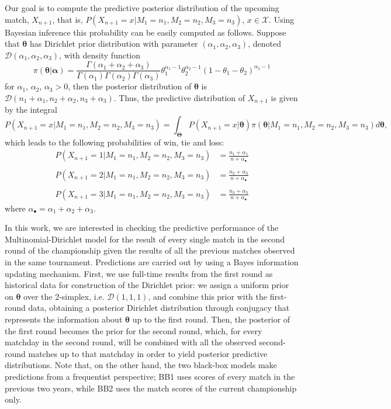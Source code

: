 \documentclass[journal,article,accept,moreauthors,pdftex,12pt,a4paper]{mdpi}
\begin{document}
		Our goal is to compute the predictive posterior distribution of the
		upcoming match, $X_{n+1}$, that is,
		$P(X_{n+1}=x|M_1=n_1,M_2=n_2,M_3=n_3)$, $x\in\mathcal{X}$. Using
		Bayesian inference this probability can be easily computed as
		follows. Suppose that $\boldsymbol{\theta}$ has Dirichlet prior distribution
		with parameter $(\alpha_1,\alpha_2,\alpha_3)$, denoted
		$\mathcal{D}(\alpha_1,\alpha_2,\alpha_3)$, with density function
		\[
		\pi(\boldsymbol{\theta}|\boldsymbol{\alpha})=\frac{\Gamma(\alpha_1+\alpha_2+\alpha_3)}{\Gamma(\alpha_1)\Gamma(\alpha_2)\Gamma(\alpha_3)}\theta_1^{\alpha_1-1}\theta_2^{\alpha_2-1}(1-\theta_1-\theta_2)^{\alpha_3-1}
		\]
		\noindent for $\alpha_1$, $\alpha_2$, $\alpha_3 > 0$, then the
		posterior distribution of $\boldsymbol{\theta}$ is
		$\mathcal{D}(n_1+\alpha_1,n_2+\alpha_2,n_3+\alpha_3)$. Thus, the
		predictive distribution of $X_{n + 1}$ is given by the
		integral
		$$
		P(X_{n + 1} = x | M_1 = n_1, M_2 = n_2, M_3 = n_3) = \int_{\boldsymbol{\Theta}} P(X_{n
			+ 1} = x | \boldsymbol{\theta}) \pi(\boldsymbol{\theta} | M_1 = n_1, M_2 = n_2, M_3
		= n_3) d\boldsymbol{\theta},
		$$
		which leads to the following probabilities of win, tie and loss:
		\begin{align*}
			P(X_{n+1} = 1 | M_1=n_1,M_2=n_2,M_3=n_3) &=
			\frac{n_1+\alpha_1}{n+\alpha_{\bullet}}\\
			& \\
			P(X_{n+1} = 2 | M_1=n_1,M_2=n_2,M_3=n_3) &=
			\frac{n_2+\alpha_2}{n+\alpha_{\bullet}} \\
			& \\
			P(X_{n+1} = 3 | M_1=n_1, M_2=n_2, M_3=n_3) &=
			\frac{n_3+\alpha_3}{n+\alpha_{\bullet}}
		\end{align*}
		\noindent where $\alpha_{\bullet} =\alpha_1+\alpha_2+\alpha_3$.
		
		
		In this work, we are interested in checking the predictive performance of the Multinomial-Dirichlet 
		model for the result of every single match in the second round of the championship given the results 
		of all the previous matches observed in the same tournament. Predictions 
		are carried out by using a Bayes information updating mechanism. First, we use full-time 
		results from the first round as historical data for construction of the Dirichlet prior: we assign a uniform prior on  
		$\boldsymbol{\theta}$ over the 2-simplex, i.e. $\mathcal{D}(1, 1, 1)$, and combine this prior with 
		the first-round data, obtaining a posterior Dirichlet distribution through conjugacy that represents 
		the information about $\boldsymbol{\theta}$ up to the first round. Then, the posterior of the first 
		round becomes the prior for the second round, which, for every matchday in the second round, will be combined with all the observed second-round matches 
		up to that matchday in order to yield posterior predictive distributions. Note that, on the other hand, the two 
		black-box models make predictions from a frequentist perspective; BB1 uses scores of every match 
		in the previous two years, while BB2 uses the match scores of the current championship only.
		
\end{document}
